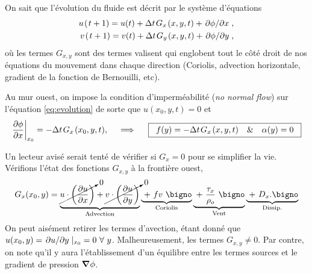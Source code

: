 \documentclass[10pt]{report}
\numberwithin{equation}{section}
\newcommand{\pt}{\hspace{1pt}} %
\begin{document}
On sait que l'évolution du fluide est décrit par le système d'équations
\begin{subequations}
\begin{align}
u\pt (\pt t+1)  = u(t) + \Delta t \pt G_x\pt(x,y,t) + \pdv*{\phi}{x}, \label{eq:evolution}\\
v\pt (\pt t+1)  = v(t) + \Delta t \pt G_y\pt(x,y,t) + \pdv*{\phi}{y},
\end{align}
\end{subequations}
où les termes \(G_{x,y}\) sont des termes valisent qui englobent tout le côté droit de nos équations du mouvement dans chaque direction (Coriolis, advection horizontale, gradient de la fonction de Bernouilli, etc).\bigskip

Au mur ouest, on impose la condition d'imperméabilité (\emph{no normal flow}) sur l'équation \ref{eq:evolution} de sorte que \(u(x_0,y,t) = 0\) et
\begin{equation}
\eval{\pdv{\phi}{x}}_{x_0} = -\Delta t \pt G_x\pt(x_0,y,t),
\hspace{0.5cm}\Longrightarrow\hspace{0.5cm}
\boxed{\hspace{0.2cm}f(y) = -\Delta t \pt G_x\pt(x,y,t) \hspace{0.35cm}\&\hspace{0.35cm} \alpha(y) = 0 \hspace{0.2cm}}
\end{equation}

Un lecteur avisé serait tenté de vérifier si \(G_x = 0\) pour se simplifier la vie.
Vérifions l'état des fonctions \(G_{x,y}\) à la frontière ouest,
\begin{equation}
G_x(x_0,y) = \underbrace{\cancelto{0}{u\cdot\qty(\pdv{u}{x})} + \cancelto{0}{v\cdot\qty(\pdv{u}{y})}}_\text{Advection}
\underbrace{\ +\ f v \ \bigno}_\text{Coriolis}
\underbrace{\ +\ \frac{\tau_x}{\rho_o}\ \bigno}_\text{Vent}
\underbrace{\ +\ D_x. \bigno}_\text{Dissip.}
\end{equation}
On peut aisément retirer les termes d'avection, étant donné que \({u(x_0,y)=\pdv*{u}{y}|_{x_0} = 0\ \forall\ y}\).
Malheureusement, les termes \({G_{x,y} \neq 0}\).
Par contre, on note qu'il y aura l'établissement d'un équilibre entre les termes sources et le gradient de pression \(\gradient{\phi}\).

\printbibliography
\end{document}
